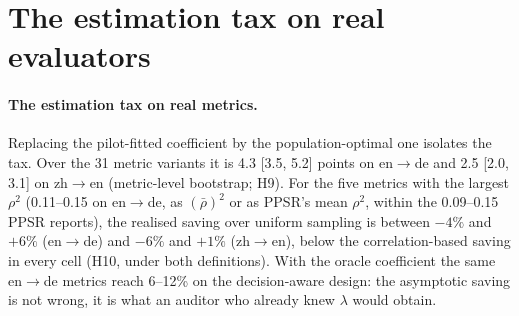 \documentclass[11pt]{article}
\begin{document}
\section{The estimation tax on real evaluators}\label{app:tax}
\paragraph{The estimation tax on real metrics.} Replacing the pilot-fitted coefficient by the population-optimal one
isolates the tax. Over the 31 metric variants it is 4.3 [3.5, 5.2] points on en$\to$de and 2.5 [2.0, 3.1] on zh$\to$en
(metric-level bootstrap; H9). For the five metrics with the largest $\rho^2$ (0.11--0.15 on en$\to$de, as $(\bar\rho)^2$
or as PPSR's mean $\rho^2$, within the 0.09--0.15 PPSR reports), the realised saving over uniform sampling is between
$-4\%$ and $+6\%$ (en$\to$de) and $-6\%$ and $+1\%$ (zh$\to$en), below the correlation-based saving in every cell (H10,
under both definitions). With the oracle coefficient the same en$\to$de metrics reach 6--12\% on the decision-aware
design: the asymptotic saving is not wrong, it is what an auditor who already knew $\lambda$ would obtain.
\end{document}
